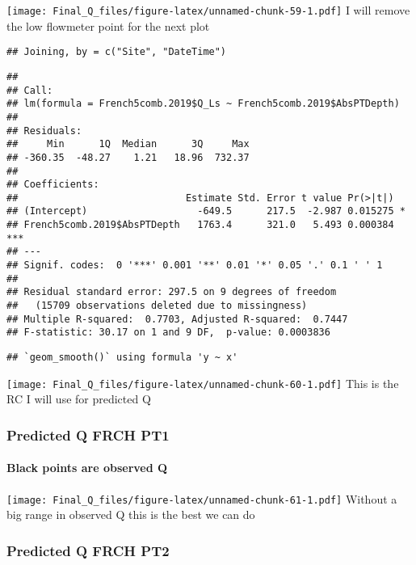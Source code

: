 \documentclass[
]{article}
\begin{document}
\texttt{[image: Final\_Q\_files/figure-latex/unnamed-chunk-59-1.pdf]} I
will remove the low flowmeter point for the next plot

\begin{verbatim}
## Joining, by = c("Site", "DateTime")
\end{verbatim}

\begin{verbatim}
## 
## Call:
## lm(formula = French5comb.2019$Q_Ls ~ French5comb.2019$AbsPTDepth)
## 
## Residuals:
##     Min      1Q  Median      3Q     Max 
## -360.35  -48.27    1.21   18.96  732.37 
## 
## Coefficients:
##                             Estimate Std. Error t value Pr(>|t|)    
## (Intercept)                   -649.5      217.5  -2.987 0.015275 *  
## French5comb.2019$AbsPTDepth   1763.4      321.0   5.493 0.000384 ***
## ---
## Signif. codes:  0 '***' 0.001 '**' 0.01 '*' 0.05 '.' 0.1 ' ' 1
## 
## Residual standard error: 297.5 on 9 degrees of freedom
##   (15709 observations deleted due to missingness)
## Multiple R-squared:  0.7703, Adjusted R-squared:  0.7447 
## F-statistic: 30.17 on 1 and 9 DF,  p-value: 0.0003836
\end{verbatim}

\begin{verbatim}
## `geom_smooth()` using formula 'y ~ x'
\end{verbatim}

\texttt{[image: Final\_Q\_files/figure-latex/unnamed-chunk-60-1.pdf]} This
is the RC I will use for predicted Q

\hypertarget{predicted-q-frch-pt1}{%
\subsubsection{Predicted Q FRCH PT1}\label{predicted-q-frch-pt1}}

\hypertarget{black-points-are-observed-q-5}{%
\paragraph{Black points are observed
Q}\label{black-points-are-observed-q-5}}

\texttt{[image: Final\_Q\_files/figure-latex/unnamed-chunk-61-1.pdf]}
Without a big range in observed Q this is the best we can do

\hypertarget{predicted-q-frch-pt2}{%
\subsubsection{Predicted Q FRCH PT2}\label{predicted-q-frch-pt2}}
\end{document}
